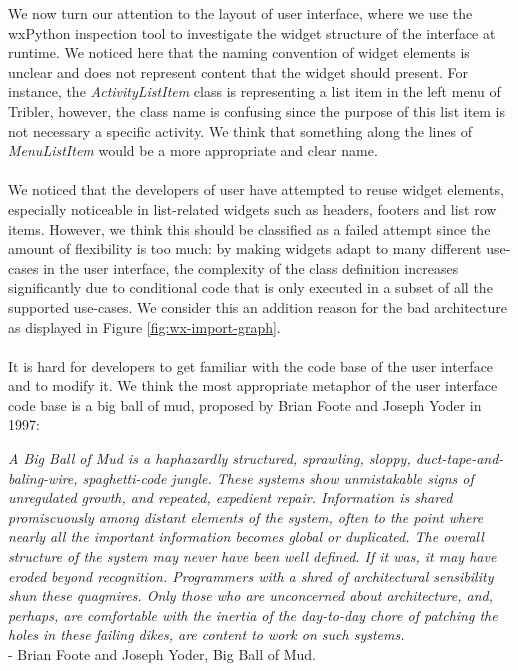We now turn our attention to the layout of user interface, where we use the wxPython inspection tool to investigate the widget structure of the interface at runtime. We noticed here that the naming convention of widget elements is unclear and does not represent content that the widget should present. For instance, the \emph{ActivityListItem} class is representing a list item in the left menu of Tribler, however, the class name is confusing since the purpose of this list item is not necessary a specific activity. We think that something along the lines of \emph{MenuListItem} would be a more appropriate and clear name.\\\\
We noticed that the developers of user have attempted to reuse widget elements, especially noticeable in list-related widgets such as headers, footers and list row items. However, we think this should be classified as a failed attempt since the amount of flexibility is too much: by making widgets adapt to many different use-cases in the user interface, the complexity of the class definition increases significantly due to conditional code that is only executed in a subset of all the supported use-cases. We consider this an addition reason for the bad architecture as displayed in Figure \ref{fig:wx-import-graph}.\\\\
It is hard for developers to get familiar with the code base of the user interface and to modify it. We think the most appropriate metaphor of the user interface code base is a big ball of mud, proposed by Brian Foote and Joseph Yoder in 1997\cite{foote1997big}:

\begin{displayquote}
	\emph{A Big Ball of Mud is a haphazardly structured, sprawling, sloppy, duct-tape-and-baling-wire, spaghetti-code jungle. These systems show unmistakable signs of unregulated growth, and repeated, expedient repair. Information is shared promiscuously among distant elements of the system, often to the point where nearly all the important information becomes global or duplicated. The overall structure of the system may never have been well defined. If it was, it may have eroded beyond recognition. Programmers with a shred of architectural sensibility shun these quagmires. Only those who are unconcerned about architecture, and, perhaps, are comfortable with the inertia of the day-to-day chore of patching the holes in these failing dikes, are content to work on such systems.}\\
	- Brian Foote and Joseph Yoder, Big Ball of Mud\cite{foote1997big}.
\end{displayquote}

